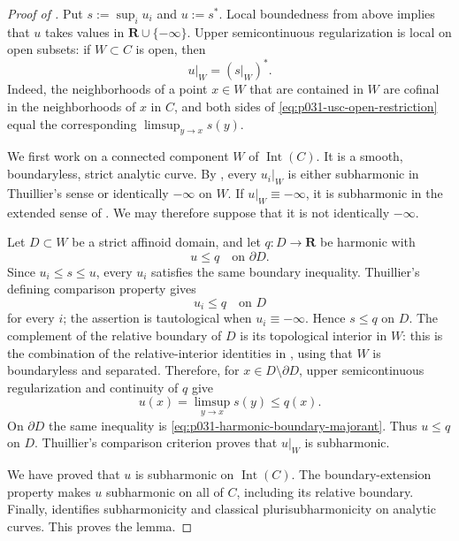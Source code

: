 \begin{proof}[Proof of ]
Put \(s:=\sup_i u_i\) and \(u:=s^*\).  Local boundedness from above implies
that \(u\) takes values in \(\mathbf R\cup\{-\infty\}\).  Upper
semicontinuous regularization is local on open subsets: if \(W\subset C\)
is open, then
\begin{equation}
\label{eq:p031-usc-open-restriction}
                         u|_W=(s|_W)^*.
\end{equation}
Indeed, the neighborhoods of a point \(x\in W\) that are contained in
\(W\) are cofinal in the neighborhoods of \(x\) in \(C\), and both sides
of \eqref{eq:p031-usc-open-restriction} equal the corresponding
\(\limsup_{y\to x}s(y)\).

We first work on a connected component \(W\) of
\(\operatorname{Int}(C)\).  It is a smooth, boundaryless, strict analytic
curve.  By \cite[\S4.1.2 and \S3.4.1]{GR25Classical}, every \(u_i|_W\)
is either subharmonic in Thuillier's sense or identically \(-\infty\) on
\(W\).  If \(u|_W\equiv-\infty\), it is subharmonic in the extended sense
of \cite[Definition~3.4]{GR25Classical}.  We may therefore suppose that it
is not identically \(-\infty\).

Let \(D\subset W\) be a strict affinoid domain, and let
\(q:D\to\mathbf R\) be harmonic with
\begin{equation}
\label{eq:p031-harmonic-boundary-majorant}
                              u\leq q
                              \quad\text{on }\partial D.
\end{equation}
Since \(u_i\leq s\leq u\), every \(u_i\) satisfies the same boundary
inequality.  Thuillier's defining comparison property gives
\[
                              u_i\leq q
                              \quad\text{on }D
\]
for every \(i\); the assertion is tautological when \(u_i\equiv-\infty\).
Hence \(s\leq q\) on \(D\).  The complement of the relative boundary of
\(D\) is its topological interior in \(W\): this is the combination of
the relative-interior identities in \cite[\S2.11(3),(4)]{GR25Classical},
using that \(W\) is boundaryless and separated.  Therefore, for
\(x\in D\setminus\partial D\), upper semicontinuous regularization and
continuity of \(q\) give
\[
                         u(x)=\limsup_{y\to x}s(y)
                              \leq q(x).
\]
On \(\partial D\) the same inequality is
\eqref{eq:p031-harmonic-boundary-majorant}.  Thus \(u\leq q\) on \(D\).
Thuillier's comparison criterion proves that \(u|_W\) is subharmonic.

We have proved that \(u\) is subharmonic on
\(\operatorname{Int}(C)\).  The boundary-extension property
\cite[Proposition~3.5(3)]{GR25Classical} makes \(u\) subharmonic on all of
\(C\), including its relative boundary.  Finally,
\cite[\S4.1.2]{GR25Classical} identifies subharmonicity and classical
plurisubharmonicity on analytic curves.  This proves the lemma.
\end{proof}

